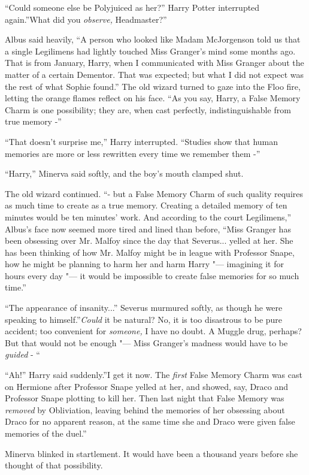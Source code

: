 ``Could someone else be Polyjuiced as her?'' Harry Potter interrupted
again.''What did you \emph{observe,} Headmaster?''

Albus said heavily, ``A person who looked like Madam McJorgenson told us
that a single Legilimens had lightly touched Miss Granger's mind some
months ago. That is from January, Harry, when I communicated with Miss
Granger about the matter of a certain Dementor. That was expected; but
what I did not expect was the rest of what Sophie found.'' The old
wizard turned to gaze into the Floo fire, letting the orange flames
reflect on his face. ``As you say, Harry, a False Memory Charm is one
possibility; they are, when cast perfectly, indistinguishable from true
memory -''

``That doesn't surprise me,'' Harry interrupted. ``Studies show that
human memories are more or less rewritten every time we remember them
-''

``Harry,'' Minerva said softly, and the boy's mouth clamped shut.

The old wizard continued. ``- but a False Memory Charm of such quality
requires as much time to create as a true memory. Creating a detailed
memory of ten minutes would be ten minutes' work. And according to the
court Legilimens,'' Albus's face now seemed more tired and lined than
before, ``Miss Granger has been obsessing over Mr. Malfoy since the day
that Severus... yelled at her. She has been thinking of how Mr.
Malfoy might be in league with Professor Snape, how he might be planning
to harm her and harm Harry "--- imagining it for hours every day "--- it would
be impossible to create false memories for so much time.''

``The appearance of insanity...'' Severus murmured softly, as
though he were speaking to himself.''\emph{Could} it be natural? No, it
is too disastrous to be pure accident; too convenient for
\emph{someone,} I have no doubt. A Muggle drug, perhaps? But that would
not be enough "--- Miss Granger's madness would have to be \emph{guided} -
``

``Ah!'' Harry said suddenly.''I get it now. The \emph{first} False
Memory Charm was cast on Hermione after Professor Snape yelled at her,
and showed, say, Draco and Professor Snape plotting to kill her. Then
last night that False Memory was \emph{removed} by Obliviation, leaving
behind the memories of her obsessing about Draco for no apparent reason,
at the same time she and Draco were given false memories of the duel.''

Minerva blinked in startlement. It would have been a thousand years
before she thought of that possibility.

